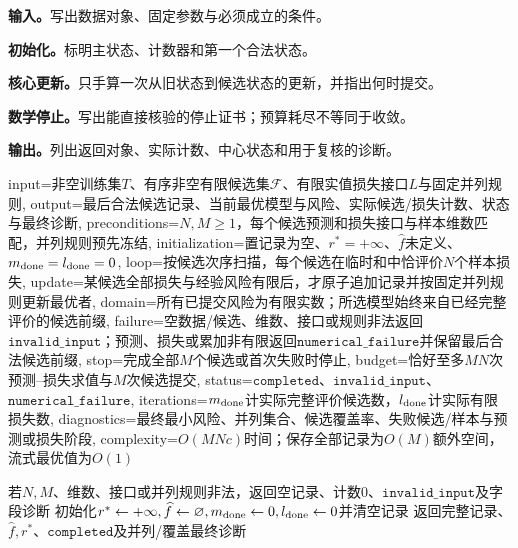 
\begin{keypointbox}[title={有限假设空间的经验风险选择：五步阅读}]
\textbf{输入。}写出数据对象、固定参数与必须成立的条件。\par
\textbf{初始化。}标明主状态、计数器和第一个合法状态。\par
\textbf{核心更新。}只手算一次从旧状态到候选状态的更新，并指出何时提交。\par
\textbf{数学停止。}写出能直接核验的停止证书；预算耗尽不等同于收敛。\par
\textbf{输出。}列出返回对象、实际计数、中心状态和用于复核的诊断。
\end{keypointbox}

\begin{AlgorithmContract}{
  input={非空训练集$T$、有序非空有限候选集$\mathcal F$、有限实值损失接口$L$与固定并列规则},
  output={最后合法候选记录、当前最优模型与风险、实际候选/损失计数、状态与最终诊断},
  preconditions={$N,M\ge1$，每个候选预测和损失接口与样本维数匹配，并列规则预先冻结},
  initialization={置记录为空、$r^*=+\infty$、$\widehat f$未定义、$m_{\rm done}=l_{\rm done}=0$},
  loop={按候选次序扫描，每个候选在临时和中恰评价$N$个样本损失},
  update={某候选全部损失与经验风险有限后，才原子追加记录并按固定并列规则更新最优者},
  domain={所有已提交风险为有限实数；所选模型始终来自已经完整评价的候选前缀},
  failure={空数据/候选、维数、接口或规则非法返回$\mathtt{invalid\_input}$；预测、损失或累加非有限返回$\mathtt{numerical\_failure}$并保留最后合法候选前缀},
  stop={完成全部$M$个候选或首次失败时停止},
  budget={恰好至多$MN$次预测--损失求值与$M$次候选提交},
  status={$\mathtt{completed}$、$\mathtt{invalid\_input}$、$\mathtt{numerical\_failure}$},
  iterations={$m_{\rm done}$计实际完整评价候选数，$l_{\rm done}$计实际有限损失数},
  diagnostics={最终最小风险、并列集合、候选覆盖率、失败候选/样本与预测或损失阶段},
  complexity={$O(MNc)$时间；保存全部记录为$O(M)$额外空间，流式最优值为$O(1)$}
}
\begin{algorithm}[H]
\caption{有限假设空间的经验风险选择}\label{alg:V1-C09-finite-erm}
若$N,M$、维数、接口或并列规则非法，返回空记录、计数$0$、$\mathtt{invalid\_input}$及字段诊断\;
初始化$r^*\leftarrow+\infty,\widehat f\leftarrow\varnothing,m_{\rm done}\leftarrow0,l_{\rm done}\leftarrow0$并清空记录\;
返回完整记录、$\widehat f,r^*$、$\mathtt{completed}$及并列/覆盖最终诊断\;
\end{algorithm}
\end{AlgorithmContract}
